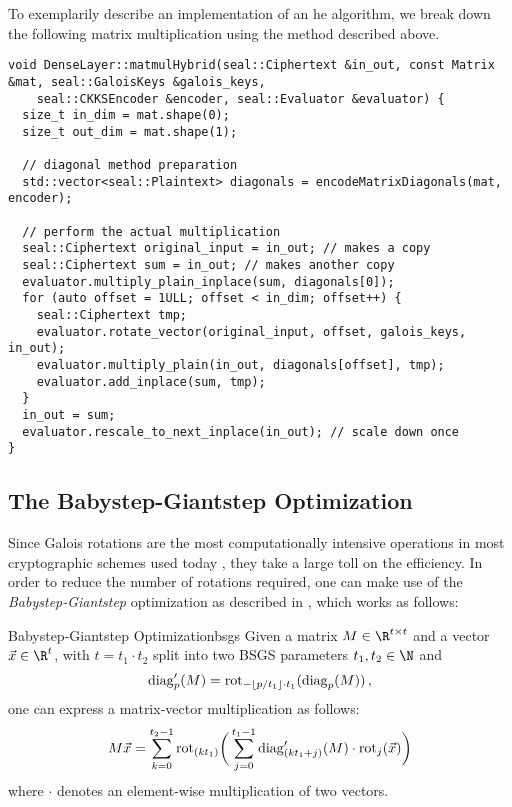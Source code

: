 To exemplarily describe an implementation of an \gls{he} algorithm, we break down the following matrix multiplication using the method described above.
\begin{verbatim}
void DenseLayer::matmulHybrid(seal::Ciphertext &in_out, const Matrix &mat, seal::GaloisKeys &galois_keys,
    seal::CKKSEncoder &encoder, seal::Evaluator &evaluator) {
  size_t in_dim = mat.shape(0);
  size_t out_dim = mat.shape(1);

  // diagonal method preparation
  std::vector<seal::Plaintext> diagonals = encodeMatrixDiagonals(mat, encoder);

  // perform the actual multiplication
  seal::Ciphertext original_input = in_out; // makes a copy
  seal::Ciphertext sum = in_out; // makes another copy
  evaluator.multiply_plain_inplace(sum, diagonals[0]);
  for (auto offset = 1ULL; offset < in_dim; offset++) {
    seal::Ciphertext tmp;
    evaluator.rotate_vector(original_input, offset, galois_keys, in_out);
    evaluator.multiply_plain(in_out, diagonals[offset], tmp);
    evaluator.add_inplace(sum, tmp);
  }
  in_out = sum;
  evaluator.rescale_to_next_inplace(in_out); // scale down once
}
\end{verbatim}

\subsection{The Babystep-Giantstep Optimization}
Since Galois rotations are the most computationally intensive operations in most cryptographic schemes used today \parencite{2021-pasta}, they take a large toll on the efficiency.
In order to reduce the number of rotations required, one can make use of the \textit{Babystep-Giantstep} optimization as described in \cite{2018-faster-helib}, which works as follows:

\begin{theorem}{Babystep-Giantstep Optimization}{bsgs}
  Given a matrix $M \in \R^{t \times t}$ and a vector $\vec{x} \in \R^t$, with $t = t_1 \cdot t_2$ split into two BSGS parameters $t_1, t_2 \in \N$ and
  $$\mathrm{diag}'_p(M) = \mathrm{rot}_{-\lfloor p/t_1 \rfloor \cdot t_1}(\mathrm{diag}_p(M))\,,$$
  one can express a matrix-vector multiplication as follows:
  \begin{equation*}
    M \vec{x} = \sum_{k=0}^{t_2-1} \mathrm{rot}_{(kt_1)} \bigg(
    \sum_{j=0}^{t_1-1} \mathrm{diag}'_{(kt_1+j)}(M) \cdot \mathrm{rot}_j(\vec{x})
    \bigg)
  \end{equation*}
  where $\cdot$ denotes an element-wise multiplication of two vectors.
\end{theorem}

